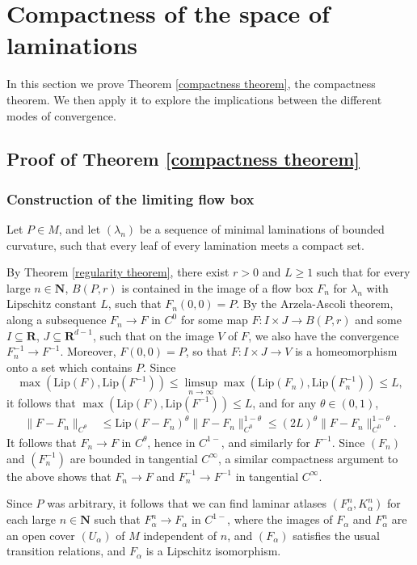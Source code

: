 \documentclass[reqno,11pt]{amsart}
\newcommand{\NN}{\mathbf{N}}
\newcommand{\RR}{\mathbf{R}}
\newcommand{\Lip}{\mathrm{Lip}}
\theoremstyle{definition}
\numberwithin{equation}{section}
\begin{document}
\section{Compactness of the space of laminations}\label{CompactnessSec}
In this section we prove Theorem \ref{compactness theorem}, the compactness theorem.
We then apply it to explore the implications between the different modes of convergence.


\subsection{Proof of Theorem \texorpdfstring{\ref{compactness theorem}}{B}}
\subsubsection{Construction of the limiting flow box}
Let $P \in M$, and let $(\lambda_n)$ be a sequence of minimal laminations of bounded curvature, such that every leaf of every lamination meets a compact set.

By Theorem \ref{regularity theorem}, there exist $r > 0$ and $L \geq 1$ such that for every large $n \in \NN$, $B(P, r)$ is contained in the image of a flow box $F_n$ for $\lambda_n$ with Lipschitz constant $L$, such that $F_n(0, 0) = P$.
By the Arzela-Ascoli theorem, along a subsequence $F_n \to F$ in $C^0$ for some map $F: I \times J \to B(P, r)$ and some $I \subseteq \RR$, $J \subseteq \RR^{d - 1}$, such that on the image $V$ of $F$, we also have the convergence $F_n^{-1} \to F^{-1}$.
Moreover, $F(0, 0) = P$, so that $F: I \times J \to V$ is a homeomorphism onto a set which contains $P$.
Since
$$\max(\Lip(F), \Lip(F^{-1})) \leq \limsup_{n \to \infty} \max(\Lip(F_n), \Lip(F_n^{-1})) \leq L,$$
it follows that $\max(\Lip(F), \Lip(F^{-1})) \leq L$, and for any $\theta \in (0, 1)$,
\begin{align*}
	\|F - F_n\|_{C^\theta}
	&\leq \Lip(F - F_n)^\theta \|F - F_n\|_{C^0}^{1 - \theta} \leq (2L)^\theta \|F - F_n\|_{C^0}^{1 - \theta}.
\end{align*}
It follows that $F_n \to F$ in $C^\theta$, hence in $C^{1-}$, and similarly for $F^{-1}$.
Since $(F_n)$ and $(F_n^{-1})$ are bounded in tangential $C^\infty$, a similar compactness argument to the above shows that $F_n \to F$ and $F_n^{-1} \to F^{-1}$ in tangential $C^\infty$.

Since $P$ was arbitrary, it follows that we can find laminar atlases $(F_\alpha^n, K_\alpha^n)$ for each large $n \in \NN$ such that $F_\alpha^n \to F_\alpha$ in $C^{1-}$, where the images of $F_\alpha$ and $F_\alpha^n$ are an open cover $(U_\alpha)$ of $M$ independent of $n$, and $(F_\alpha)$ satisfies the usual transition relations, and $F_\alpha$ is a Lipschitz isomorphism.
\end{document}
